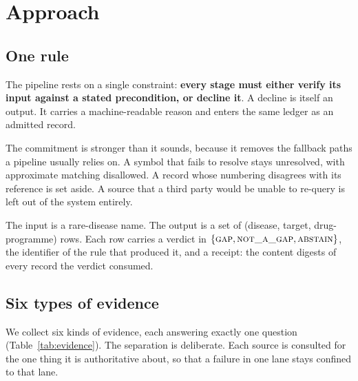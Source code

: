 \section{Approach}

\subsection{One rule}

The pipeline rests on a single constraint: \textbf{every stage must either
verify its input against a stated precondition, or decline it}. A decline is
itself an output. It carries a machine-readable reason and enters the same
ledger as an admitted record.

The commitment is stronger than it sounds, because it removes the fallback
paths a pipeline usually relies on. A symbol that fails to resolve stays
unresolved, with approximate matching disallowed. A record whose numbering
disagrees with its reference is set aside. A source that a third party would
be unable to re-query is left out of the system entirely.

The input is a rare-disease name. The output is a set of (disease, target,
drug-programme) rows. Each row carries a verdict in $\{\textsc{gap},
\textsc{not\_a\_gap}, \textsc{abstain}\}$, the identifier of the rule that
produced it, and a receipt: the content digests of every record the verdict
consumed.

\subsection{Six types of evidence}

We collect six kinds of evidence, each answering exactly one question
(Table~\ref{tab:evidence}). The separation is deliberate. Each source is
consulted for the one thing it is authoritative about, so that a failure in
one lane stays confined to that lane.

